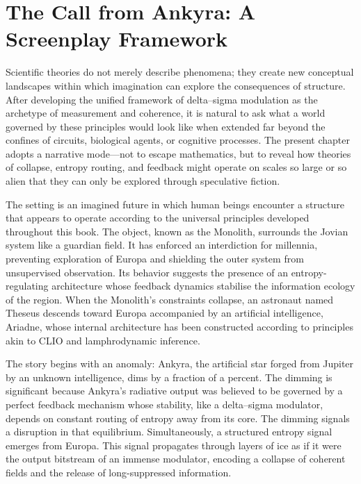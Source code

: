 
\chapter{The Call from Ankyra: A Screenplay Framework}

Scientific theories do not merely describe phenomena; they create new conceptual landscapes within which imagination can explore the consequences of structure. After developing the unified framework of delta–sigma modulation as the archetype of measurement and coherence, it is natural to ask what a world governed by these principles would look like when extended far beyond the confines of circuits, biological agents, or cognitive processes. The present chapter adopts a narrative mode—not to escape mathematics, but to reveal how theories of collapse, entropy routing, and feedback might operate on scales so large or so alien that they can only be explored through speculative fiction.

The setting is an imagined future in which human beings encounter a structure that appears to operate according to the universal principles developed throughout this book. The object, known as the Monolith, surrounds the Jovian system like a guardian field. It has enforced an interdiction for millennia, preventing exploration of Europa and shielding the outer system from unsupervised observation. Its behavior suggests the presence of an entropy-regulating architecture whose feedback dynamics stabilise the information ecology of the region. When the Monolith’s constraints collapse, an astronaut named Theseus descends toward Europa accompanied by an artificial intelligence, Ariadne, whose internal architecture has been constructed according to principles akin to CLIO and lamphrodynamic inference.

The story begins with an anomaly: Ankyra, the artificial star forged from Jupiter by an unknown intelligence, dims by a fraction of a percent. The dimming is significant because Ankyra’s radiative output was believed to be governed by a perfect feedback mechanism whose stability, like a delta–sigma modulator, depends on constant routing of entropy away from its core. The dimming signals a disruption in that equilibrium. Simultaneously, a structured entropy signal emerges from Europa. This signal propagates through layers of ice as if it were the output bitstream of an immense modulator, encoding a collapse of coherent fields and the release of long-suppressed information.

